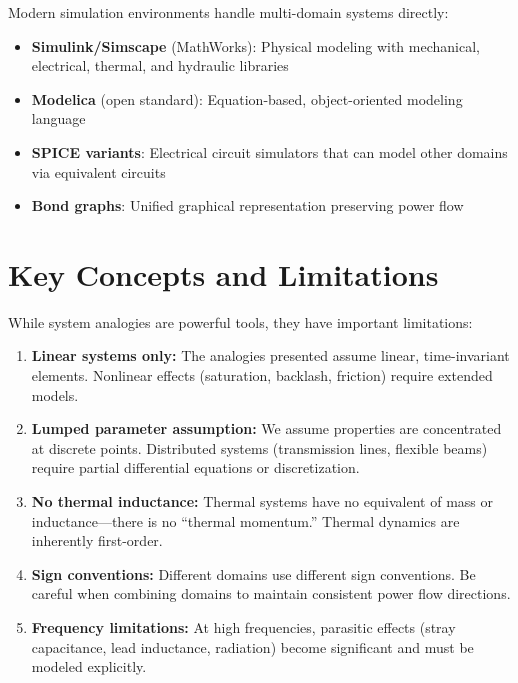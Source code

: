 \begin{practicalbox}[title=Multi-Domain Simulation Tools]
Modern simulation environments handle multi-domain systems directly:
\begin{itemize}
    \item \textbf{Simulink/Simscape} (MathWorks): Physical modeling with mechanical, electrical, thermal, and hydraulic libraries
    \item \textbf{Modelica} (open standard): Equation-based, object-oriented modeling language
    \item \textbf{SPICE variants}: Electrical circuit simulators that can model other domains via equivalent circuits
    \item \textbf{Bond graphs}: Unified graphical representation preserving power flow
\end{itemize}
\end{practicalbox}

\section{Key Concepts and Limitations}
\label{sec:limitations}

\begin{warningbox}[title=Limitations of System Analogies]
While system analogies are powerful tools, they have important limitations:

\begin{enumerate}
    \item \textbf{Linear systems only:} The analogies presented assume linear, time-invariant elements. Nonlinear effects (saturation, backlash, friction) require extended models.

    \item \textbf{Lumped parameter assumption:} We assume properties are concentrated at discrete points. Distributed systems (transmission lines, flexible beams) require partial differential equations or discretization.

    \item \textbf{No thermal inductance:} Thermal systems have no equivalent of mass or inductance---there is no ``thermal momentum.'' Thermal dynamics are inherently first-order.

    \item \textbf{Sign conventions:} Different domains use different sign conventions. Be careful when combining domains to maintain consistent power flow directions.

    \item \textbf{Frequency limitations:} At high frequencies, parasitic effects (stray capacitance, lead inductance, radiation) become significant and must be modeled explicitly.
\end{enumerate}
\end{warningbox}

